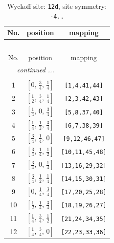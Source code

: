 \documentclass[fleqn,8pt]{jsarticle}
\begin{document}
\begin{longtable}{ccc}
\caption{Wyckoff site: {\tt 12d}, site symmetry: {\tt -4..}}
 \\
 \hline \hline
No. & position & mapping \\ \hline \endfirsthead

\multicolumn{2}{l}{\tablename\ \thetable{}} \\
 \hline \hline
No. & position & mapping \\ \hline \endhead

 \hline \hline
\multicolumn{2}{r}{\footnotesize\it continued ...} \\ \endfoot

 \hline \hline
\multicolumn{2}{r}{} \\ \endlastfoot

1 & $\left[ 0,\, \frac{3}{4},\, \frac{1}{4} \right]$ & {\tt [1,4,41,44]} \\ \hline
2 & $\left[ \frac{1}{2},\, \frac{3}{4},\, \frac{1}{4} \right]$ & {\tt [2,3,42,43]} \\ \hline
3 & $\left[ \frac{1}{4},\, 0,\, \frac{3}{4} \right]$ & {\tt [5,8,37,40]} \\ \hline
4 & $\left[ \frac{1}{4},\, \frac{1}{2},\, \frac{3}{4} \right]$ & {\tt [6,7,38,39]} \\ \hline
5 & $\left[ \frac{3}{4},\, \frac{1}{4},\, 0 \right]$ & {\tt [9,12,46,47]} \\ \hline
6 & $\left[ \frac{3}{4},\, \frac{1}{4},\, \frac{1}{2} \right]$ & {\tt [10,11,45,48]} \\ \hline
7 & $\left[ \frac{3}{4},\, 0,\, \frac{1}{4} \right]$ & {\tt [13,16,29,32]} \\ \hline
8 & $\left[ \frac{3}{4},\, \frac{1}{2},\, \frac{1}{4} \right]$ & {\tt [14,15,30,31]} \\ \hline
9 & $\left[ 0,\, \frac{1}{4},\, \frac{3}{4} \right]$ & {\tt [17,20,25,28]} \\ \hline
10 & $\left[ \frac{1}{2},\, \frac{1}{4},\, \frac{3}{4} \right]$ & {\tt [18,19,26,27]} \\ \hline
11 & $\left[ \frac{1}{4},\, \frac{3}{4},\, \frac{1}{2} \right]$ & {\tt [21,24,34,35]} \\ \hline
12 & $\left[ \frac{1}{4},\, \frac{3}{4},\, 0 \right]$ & {\tt [22,23,33,36]} \\
\end{longtable}
\renewcommand{\arraystretch}{1.2}
\end{document}
